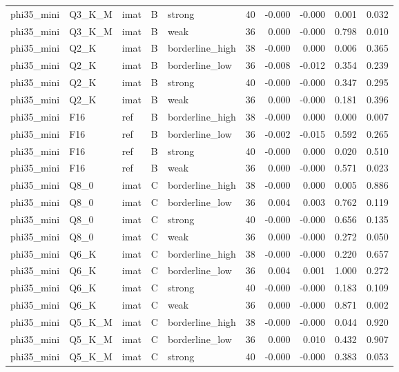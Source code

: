 \begin{tabular}{lllllrrrrr}
phi35\_mini & Q3\_K\_M & imat & B & strong & 40 & -0.000 & -0.000 & 0.001 & 0.032 \\
phi35\_mini & Q3\_K\_M & imat & B & weak & 36 & 0.000 & -0.000 & 0.798 & 0.010 \\
phi35\_mini & Q2\_K & imat & B & borderline\_high & 38 & -0.000 & 0.000 & 0.006 & 0.365 \\
phi35\_mini & Q2\_K & imat & B & borderline\_low & 36 & -0.008 & -0.012 & 0.354 & 0.239 \\
phi35\_mini & Q2\_K & imat & B & strong & 40 & -0.000 & -0.000 & 0.347 & 0.295 \\
phi35\_mini & Q2\_K & imat & B & weak & 36 & 0.000 & -0.000 & 0.181 & 0.396 \\
phi35\_mini & F16 & ref & B & borderline\_high & 38 & -0.000 & 0.000 & 0.000 & 0.007 \\
phi35\_mini & F16 & ref & B & borderline\_low & 36 & -0.002 & -0.015 & 0.592 & 0.265 \\
phi35\_mini & F16 & ref & B & strong & 40 & -0.000 & 0.000 & 0.020 & 0.510 \\
phi35\_mini & F16 & ref & B & weak & 36 & 0.000 & -0.000 & 0.571 & 0.023 \\
phi35\_mini & Q8\_0 & imat & C & borderline\_high & 38 & -0.000 & 0.000 & 0.005 & 0.886 \\
phi35\_mini & Q8\_0 & imat & C & borderline\_low & 36 & 0.004 & 0.003 & 0.762 & 0.119 \\
phi35\_mini & Q8\_0 & imat & C & strong & 40 & -0.000 & -0.000 & 0.656 & 0.135 \\
phi35\_mini & Q8\_0 & imat & C & weak & 36 & 0.000 & -0.000 & 0.272 & 0.050 \\
phi35\_mini & Q6\_K & imat & C & borderline\_high & 38 & -0.000 & -0.000 & 0.220 & 0.657 \\
phi35\_mini & Q6\_K & imat & C & borderline\_low & 36 & 0.004 & 0.001 & 1.000 & 0.272 \\
phi35\_mini & Q6\_K & imat & C & strong & 40 & -0.000 & -0.000 & 0.183 & 0.109 \\
phi35\_mini & Q6\_K & imat & C & weak & 36 & 0.000 & -0.000 & 0.871 & 0.002 \\
phi35\_mini & Q5\_K\_M & imat & C & borderline\_high & 38 & -0.000 & -0.000 & 0.044 & 0.920 \\
phi35\_mini & Q5\_K\_M & imat & C & borderline\_low & 36 & 0.000 & 0.010 & 0.432 & 0.907 \\
phi35\_mini & Q5\_K\_M & imat & C & strong & 40 & -0.000 & -0.000 & 0.383 & 0.053 \\

\end{tabular}
